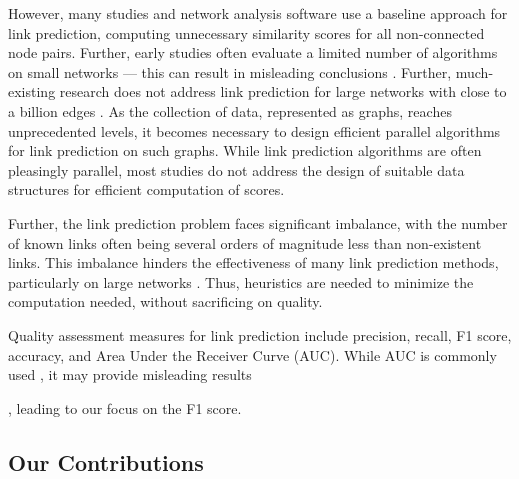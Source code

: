 However, many studies \cite{gatadi2023lpcd, saifi2023fast, benhidour2022approach, mumin2022efficient, rafiee2020cndp, guo2019node, yang2015new, papadimitriou2012fast, wang2019link} and network analysis software \cite{staudt2016networkit, csardi2006igraph} use a baseline approach for link prediction, computing unnecessary similarity scores for all non-connected node pairs. Further, early studies often evaluate a limited number of algorithms on small networks --- this can result in misleading conclusions \cite{zhou2021progresses, zhou2021experimental}. Further, much-existing research does not address link prediction for large networks with close to a billion edges \cite{muscoloni2022adaptive, mumin2022efficient, nasiri2021novel, xian2021towards, ghasemian2020stacking, mara2020benchmarking, wang2019link, xu2019distributed, mohan2017scalable, cui2016bounded, garcia2014link, papadimitriou2012fast, wang2023resisting, wang2023meta, wang2023tdan}. As the collection of data, represented as graphs, reaches unprecedented levels, it becomes necessary to design efficient parallel algorithms for link prediction on such graphs. While link prediction algorithms are often pleasingly parallel, most studies do not address the design of suitable data structures for efficient computation of scores.

Further, the link prediction problem faces significant imbalance, with the number of known links often being several orders of magnitude less than non-existent links. This imbalance hinders the effectiveness of many link prediction methods, particularly on large networks \cite{wang2014link, garcia2014link}. Thus, heuristics are needed to minimize the computation needed, without sacrificing on quality. Quality assessment measures for link prediction include precision, recall, F1 score, accuracy, and Area Under the Receiver Curve (AUC). While AUC is commonly used \cite{arrar2023comprehensive}, it may provide misleading results \cite{yang2015evaluating, lichtnwalter2012link}, leading to our focus on the F1 score.





\subsection{Our Contributions}

